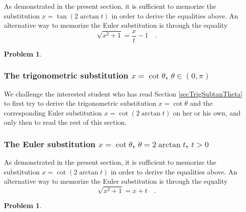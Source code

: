 \documentclass[12pt]{book}
\newtheorem{problem}[theorem]{Problem}
\begin{document}
As demonstrated in the present section, it is sufficient to memorize the substitution $x=\tan (2\arctan t)$ in order to derive the equalities above. An alternative way to memorize the Euler substitution is through the equality
\[
\sqrt{x^2+1}=\frac{x}{t}-1\quad .
\]
\begin{problem} 

\end{problem}


\subsubsection{The trigonometric substitution $x=\cot \theta$, $\theta \in \left(0, \pi\right)$}\label{secTrigSubcotTheta}
We challenge the interested student who has read Section \ref{secTrigSubtanTheta} to first try to derive the trigonometric substitution $x=\cot \theta$ and the corresponding Euler substitution $x=\cot (2\arctan t)$  on her or his own, and only then to read the rest of this section.





\subsubsection{The Euler substitution $x=\cot \theta$, $\theta=2\arctan t$, $t>0$}




As demonstrated in the present section, it is sufficient to memorize the substitution $x=\cot (2\arctan t)$ in order to derive the equalities above. An alternative way to memorize the Euler substitution is through the equality
\[
\sqrt{x^2+1}=x+t\quad .
\]
\begin{problem} 

\end{problem}

\end{document}
